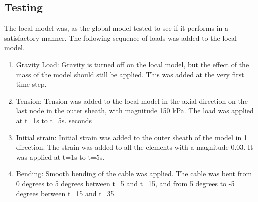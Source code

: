 \subsection {Testing}
\label{sec:localtest}
The local model was, as the global model tested to see if it performs in a satisfactory manner. The following sequence of loads was added to the local model. 
\begin{enumerate}
    \item Gravity Load: Gravity is turned off on the local model, but the effect of the mass of the model should still be applied. This was added at the very first time step.
    \item Tension: Tension was added to the local model in the axial direction on the last node in the outer sheath, with magnitude 150 kPa. The load was applied at t=1s to t=5s. seconds
    \item Initial strain: Initial strain was added to the outer sheath of the model in 1 direction. The strain was added to all the elements with a magnitude 0.03. It was applied at t=1s to t=5s.
    \item Bending: Smooth bending of the cable was applied. The cable was bent from 0 degrees to 5 degrees between t=5 and t=15, and from 5 degrees to -5 degrees between t=15 and t=35.  
\end{enumerate}


